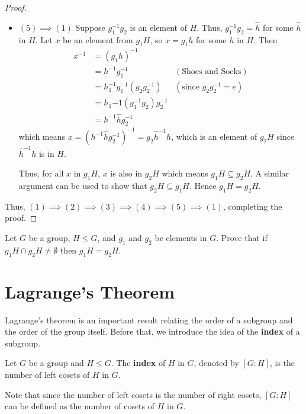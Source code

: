 \begin{proof}
\begin{itemize}
        \newpage

        \item $\boxed{(5) \implies (1)}$
        Suppose $g_1^{-1}g_2$ is an element of $H$. Thus, $g_1^{-1}g_2 = \hat{h}$ for some $\hat{h}$ in $H$. Let $x$ be an element from $g_1H$, so $x = g_1h$ for some $h$ in $H$. Then
        \begin{align*}
            x^{-1} &= (g_1h)^{-1}\\
            &= h^{-1}g_1^{-1} & (\text{Shoes and Socks})\\
            &= h_1^{-1}g_1^{-1}(g_2g_2^{-1}) & (\text{since }g_2g_2^{-1} = e)\\
            &= h_1{-1}(g_1^{-1}g_2)g_2^{-1}\\
            &= h^{-1}\hat{h}g_2^{-1}
        \end{align*}
        which means $x = \left(h^{-1}\hat{h}g_2^{-1}\right)^{-1} = g_2\hat{h}^{-1}h$, which is an element of $g_2H$ since $\hat{h}^{-1}h$ is in $H$.

        Thus, for all $x$ in $g_1H$, $x$ is also in $g_2H$ which means $g_1H \subseteq g_2H$. A similar argument can be used to show that $g_2H \subseteq g_1H$. Hence $g_1H = g_2H$.
    \end{itemize}

    Thus, $(1) \implies (2) \implies (3) \implies (4) \implies (5) \implies (1)$, completing the proof.
\end{proof}

\begin{exercise}\label{exercise-intersection-of-cosets}
    Let $G$ be a group, $H \leq G$, and $g_1$ and $g_2$ be elements in $G$. Prove that if $g_1H \cap g_2H \neq \emptyset$ then $g_1H = g_2H$.
\end{exercise}

\newpage

\section{Lagrange's Theorem}
Lagrange's theorem is an important result relating the order of a subgroup and the order of the group itself. Before that, we introduce the idea of the \textbf{index} of a subgroup.
\begin{definition}
    Let $G$ be a group and $H \leq G$. The \textbf{index} of $H$ in $G$, denoted by $[G : H]$, is the number of left cosets of $H$ in $G$.
\end{definition}
Note that since the number of left cosets is the number of right cosets, $[G : H]$ can be defined as the number of cosets of $H$ in $G$.

